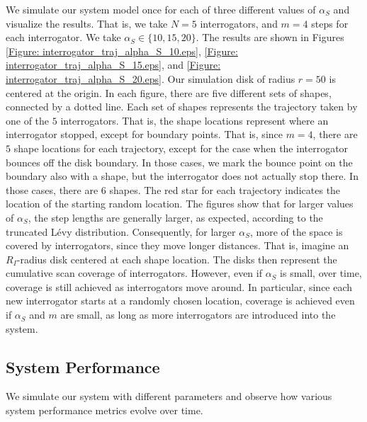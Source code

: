 We simulate our system model once for each of three different values of $\alpha_S$ and visualize the results. That is, we take $N = 5$ interrogators, and $m = 4$ steps for each interrogator. We take $\alpha_S \in \{10, 15, 20\}$. The results are shown in Figures \ref{Figure: interrogator_traj_alpha_S_10.eps}, \ref{Figure: interrogator_traj_alpha_S_15.eps}, and \ref{Figure: interrogator_traj_alpha_S_20.eps}. Our simulation disk of radius $r = 50$ is centered at the origin. In each figure, there are five different sets of shapes, connected by a dotted line. Each set of shapes represents the trajectory taken by one of the $5$ interrogators. That is, the shape locations represent where an interrogator stopped, except for boundary points. That is, since $m = 4$, there are $5$ shape locations for each trajectory, except for the case when the interrogator bounces off the disk boundary. In those cases, we mark the bounce point on the boundary also with a shape, but the interrogator does not actually stop there. In those cases, there are $6$ shapes. The red star for each trajectory indicates the location of the starting random location. The figures show that for larger values of $\alpha_S$, the step lengths are generally larger, as expected, according to the truncated L\'{e}vy distribution. Consequently, for larger $\alpha_S$, more of the space is covered by interrogators, since they move longer distances. That is, imagine an $R_I$-radius disk centered at each shape location. The disks then represent the cumulative scan coverage of interrogators. However, even if $\alpha_S$ is small, over time, coverage is still achieved as interrogators move around. In particular, since each new interrogator starts at a randomly chosen location, coverage is achieved even if $\alpha_S$ and $m$ are small, as long as more interrogators are introduced into the system.

\subsection{System Performance}
\label{Section: Distributed Passive RFID Computing: Simulations: System Performance}
We simulate our system with different parameters and observe how various system performance metrics evolve over time.

